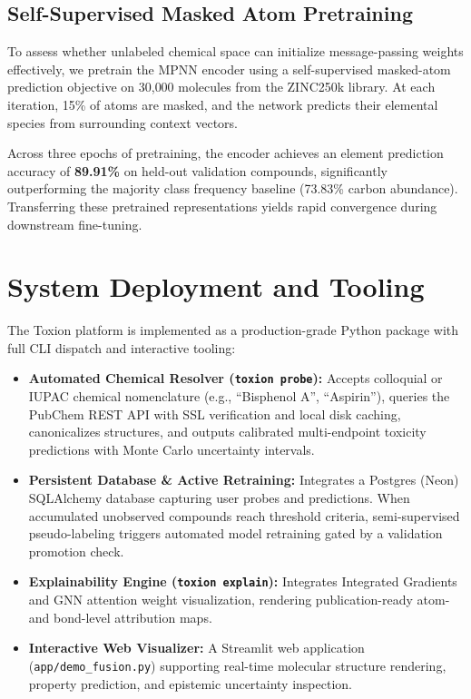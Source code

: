 \documentclass[conference]{IEEEtran}
\begin{document}
\subsection{Self-Supervised Masked Atom Pretraining}
To assess whether unlabeled chemical space can initialize message-passing weights effectively, we pretrain the MPNN encoder using a self-supervised masked-atom prediction objective on 30{,}000 molecules from the ZINC250k library. At each iteration, 15\% of atoms are masked, and the network predicts their elemental species from surrounding context vectors.

Across three epochs of pretraining, the encoder achieves an element prediction accuracy of \textbf{89.91\%} on held-out validation compounds, significantly outperforming the majority class frequency baseline (73.83\% carbon abundance). Transferring these pretrained representations yields rapid convergence during downstream fine-tuning.

\section{System Deployment and Tooling}
The Toxion platform is implemented as a production-grade Python package with full CLI dispatch and interactive tooling:
\begin{itemize}
    \item \textbf{Automated Chemical Resolver (\texttt{toxion probe}):} Accepts colloquial or IUPAC chemical nomenclature (e.g., ``Bisphenol A'', ``Aspirin''), queries the PubChem REST API with SSL verification and local disk caching, canonicalizes structures, and outputs calibrated multi-endpoint toxicity predictions with Monte Carlo uncertainty intervals.
    \item \textbf{Persistent Database \& Active Retraining:} Integrates a Postgres (Neon) SQLAlchemy database capturing user probes and predictions. When accumulated unobserved compounds reach threshold criteria, semi-supervised pseudo-labeling triggers automated model retraining gated by a validation promotion check.
    \item \textbf{Explainability Engine (\texttt{toxion explain}):} Integrates Integrated Gradients and GNN attention weight visualization, rendering publication-ready atom- and bond-level attribution maps.
    \item \textbf{Interactive Web Visualizer:} A Streamlit web application (\texttt{app/demo\_fusion.py}) supporting real-time molecular structure rendering, property prediction, and epistemic uncertainty inspection.
\end{itemize}
\end{document}
